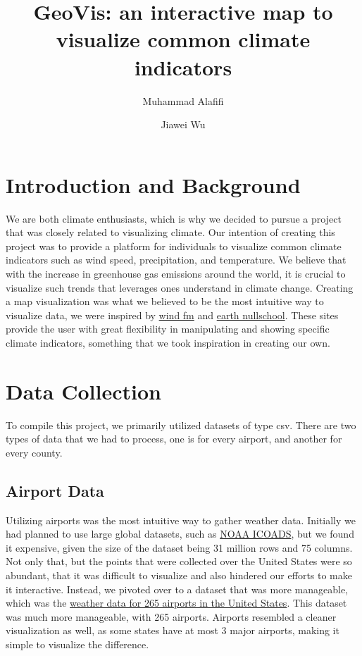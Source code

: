 \documentclass[9pt,twocolumn,twoside]{opticajnl}
\title{GeoVis: an interactive map to visualize common climate indicators}
\author[1,2]{Muhammad Alafifi}
\author[1,3]{Jiawei Wu}
\affil[1]{Computer Science Department, Rensselaer Polytechnic Institute, 1999 Burdett Ave, Troy NY, 12180}
\affil[2]{email: alafim@rpi.edu}
\affil[3]{email: wuj22@rpi.edu}
\begin{document}
\maketitle

\section{Introduction and Background}

We are both climate enthusiasts, which is why we decided to pursue a 
project that was closely related to visualizing climate. Our intention 
of creating this project was to provide a platform for individuals to 
visualize common climate indicators such as wind speed, precipitation, 
and temperature. We believe that with the increase in greenhouse gas 
emissions around the world, it is crucial to visualize such trends that 
leverages ones understand in climate change. Creating a map visualization 
was what we believed to be the most intuitive way to visualize data, we were 
inspired by \href{http://hint.fm/wind/}{wind fm} and \href{https://earth.nullschool.net/}
{earth nullschool}. These sites provide the user with great flexibility in 
manipulating and showing specific climate indicators, something that we took 
inspiration in creating our own.

\section{Data Collection}

To compile this project, we primarily utilized datasets of type csv. 
There are two types of data that we had to process, one is for every 
airport, and another for every county.

\subsection{Airport Data}

Utilizing airports was the most intuitive way to gather weather data. Initially we had planned to use large global datasets, such as \href{https://www.kaggle.com/datasets/noaa/noaa-icoads?select=icoads_core_2017}{NOAA ICOADS}, but we found it expensive, given the size of the dataset being 31 million rows and 75 columns. Not only that, but the points that were collected over the United States were so abundant, that it was difficult to visualize and also hindered our efforts to make it interactive. Instead, we pivoted over to a dataset that was more manageable, which was the \href{https://www.kaggle.com/datasets/srinathnanduri97/weather-data-for-265-airports-in-the-united-states}{weather data for 265 airports in the United States}. This dataset was much more manageable, with 265 airports. Airports resembled a cleaner visualization as well, as some states have at most 3 major airports, making it simple to visualize the difference.
\end{document}
